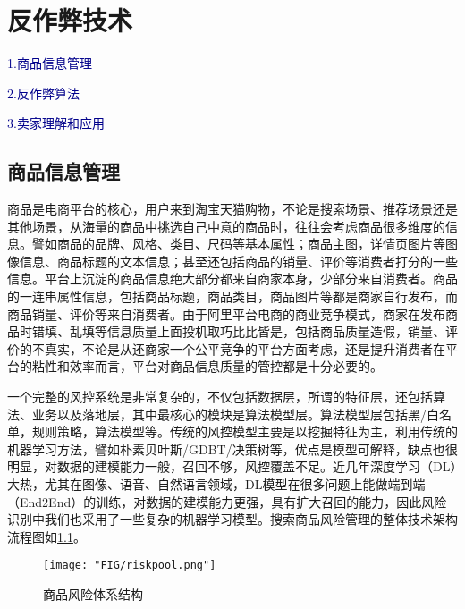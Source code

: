 
\chapter{ 反作弊技术 }
\thispagestyle{empty}

\setlength{\fboxrule}{0pt}\setlength{\fboxsep}{0cm}
\noindent\shadowbox
{
	\begin{tcolorbox}[arc=0mm,colback=lightblue,colframe=darkblue,title=学习目标与要求]
	
	\kai\textcolor{darkblue}{1.商品信息管理}
	
	\kai\textcolor{darkblue}{2.反作弊算法}
	
	\kai\textcolor{darkblue}{3.卖家理解和应用}
	
	\end{tcolorbox}
}
\setlength{\fboxrule}{1pt}\setlength{\fboxsep}{4pt} 

\section{商品信息管理}

商品是电商平台的核心，用户来到淘宝天猫购物，不论是搜索场景、推荐场景还是其他场景，从海量的商品中挑选自己中意的商品时，往往会考虑商品很多维度的信息。譬如商品的品牌、风格、类目、尺码等基本属性；商品主图，详情页图片等图像信息、商品标题的文本信息；甚至还包括商品的销量、评价等消费者打分的一些信息。平台上沉淀的商品信息绝大部分都来自商家本身，少部分来自消费者。商品的一连串属性信息，包括商品标题，商品类目，商品图片等都是商家自行发布，而商品销量、评价等来自消费者。由于阿里平台电商的商业竞争模式，商家在发布商品时错填、乱填等信息质量上面投机取巧比比皆是，包括商品质量造假，销量、评价的不真实，不论是从还商家一个公平竞争的平台方面考虑，还是提升消费者在平台的粘性和效率而言，平台对商品信息质量的管控都是十分必要的。

一个完整的风控系统是非常复杂的，不仅包括数据层，所谓的特征层，还包括算法、业务以及落地层，其中最核心的模块是算法模型层。算法模型层包括黑/白名单，规则策略，算法模型等。传统的风控模型主要是以挖掘特征为主，利用传统的机器学习方法，譬如朴素贝叶斯/GDBT/决策树等，优点是模型可解释，缺点也很明显，对数据的建模能力一般，召回不够，风控覆盖不足。近几年深度学习（DL）大热，尤其在图像、语音、自然语言领域，DL模型在很多问题上能做端到端（End2End）的训练，对数据的建模能力更强，具有扩大召回的能力，因此风险识别中我们也采用了一些复杂的机器学习模型。搜索商品风险管理的整体技术架构流程图如\ref{fig:chap12_risk_graph}。

\begin{figure}
	\centering
	\texttt{[image: "FIG/riskpool.png"]}
	\caption{商品风险体系结构}
	\label{fig:chap12_risk_graph}
\end{figure}

